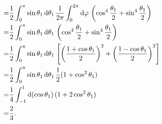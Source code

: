 \documentclass{assignment}
\begin{document}
\begin{sol}
\begin{itemize}
\begin{align}
            \notag=&\frac{1}{2}\int_0^{\pi}\sin\theta_1\,\mathrm{d}\theta_1\,\frac{1}{2\pi}\int_0^{2\pi}\mathrm{d}\varphi\,\left(\cos^4\frac{\theta_1}{2}+\sin^4\frac{\theta_1}{2}\right)\\
            \notag=&\frac{1}{2}\int_0^{\pi}\sin\theta_1\,\mathrm{d}\theta_1\,\left(\cos^4\frac{\theta_1}{2}+\sin^4\frac{\theta_1}{2}\right)\\
            \notag=&\frac{1}{2}\int_0^{\pi}\sin\theta_1\,\mathrm{d}\theta_1\,\left[\left(\frac{1+\cos\theta_1}{2}\right)^2+\left(\frac{1-\cos\theta_1}{2}\right)^2\right]\\
            \notag=&\frac{1}{2}\int_0^{\pi}\sin\theta_1\,\mathrm{d}\theta_1\,\frac{1}{2}(1+\cos^2\theta_1)\\
            \notag=&\frac{1}{4}\int_{-1}^1\mathrm{d}(\cos\theta_1)\,(1+2\cos^2\theta_1)\\
            =&\frac{2}{3}.
        \end{align}
    \end{itemize}
\end{sol}
\end{document}
